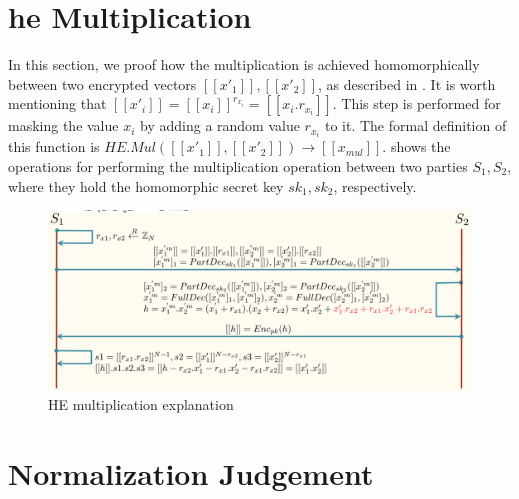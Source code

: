 \begin{appendices}

\section{\acf{he} Multiplication}
\label{app:he-multiplication}

In this section, we proof how the multiplication is achieved homomorphically between two encrypted vectors $[[x'_1]], [[x'_2]]$, as described in \cite{liu2016efficient2}.
It is worth mentioning that $[[x'_i]] = [[x_i]]^{r_{x_i}} = [[x_i . r_{x_i}]]$.
This step is performed for masking the value $x_i$ by adding a random value $r_{x_i}$ to it.
The formal definition of this function is $HE.Mul([[x'_1]], [[x'_2]]) \rightarrow [[x_{mul}]]$.
 shows the operations for performing the multiplication operation between two parties $S_1, S_2$, where they hold the homomorphic secret key $sk_1, sk_2$, respectively.

\begin{figure}[thb]
\centering
  \includegraphics[width=0.8\linewidth]{resources/HE-mul-explain.pdf}
  \caption{HE multiplication explanation}
  \label{fig:he-mul-explain}
\end{figure}
    
\section{Normalization Judgement}
\label{app:normalization-judgement}


\end{appendices}
